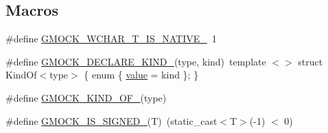 \subsection*{Macros}
\begin{DoxyCompactItemize}
\item 
\#define \mbox{\hyperlink{_obj__test_2lib_2googletest-release-1_88_81_2googlemock_2include_2gmock_2internal_2gmock-internal-utils_8h_a0725bd2b3326d282677e5197e53cc5e9}{G\+M\+O\+C\+K\+\_\+\+W\+C\+H\+A\+R\+\_\+\+T\+\_\+\+I\+S\+\_\+\+N\+A\+T\+I\+V\+E\+\_\+}}~1
\item 
\#define \mbox{\hyperlink{_obj__test_2lib_2googletest-release-1_88_81_2googlemock_2include_2gmock_2internal_2gmock-internal-utils_8h_a7d8a1871d7a30543a4e1882a8b2bbcd8}{G\+M\+O\+C\+K\+\_\+\+D\+E\+C\+L\+A\+R\+E\+\_\+\+K\+I\+N\+D\+\_\+}}(type,  kind)~template $<$$>$ struct Kind\+Of$<$type$>$ \{ enum \{ \mbox{\hyperlink{_obj__test_2lib_2googletest-master_2googlemock_2test_2gmock-matchers__test_8cc_a337b8a670efc0b086ad3af163f3121b6}{value}} = kind \}; \}
\item 
\#define \mbox{\hyperlink{_obj__test_2lib_2googletest-release-1_88_81_2googlemock_2include_2gmock_2internal_2gmock-internal-utils_8h_a72b01bdd08b78e927270885ca880ead4}{G\+M\+O\+C\+K\+\_\+\+K\+I\+N\+D\+\_\+\+O\+F\+\_\+}}(type)
\item 
\#define \mbox{\hyperlink{_obj__test_2lib_2googletest-release-1_88_81_2googlemock_2include_2gmock_2internal_2gmock-internal-utils_8h_a8ee49a1af821b48fd83849c050d0d5a2}{G\+M\+O\+C\+K\+\_\+\+I\+S\+\_\+\+S\+I\+G\+N\+E\+D\+\_\+}}(T)~(static\+\_\+cast$<$T$>$(-\/1) $<$ 0)
\end{DoxyCompactItemize}
